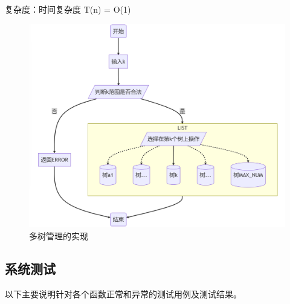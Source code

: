 \documentclass[supercite]{Experimental_Report}
\theoremstyle{definition}
\begin{document}
\begin{enumerate}
复杂度：时间复杂度 T(n) = O(1)
\begin{figure}[H]
	\centering
	\begin{minipage}{0.8\linewidth}
		\centering
		\includegraphics[width=0.9\linewidth]{images/多树管理.png}
	\end{minipage}
	\caption{多树管理的实现}
	\label{fig2-7}
\end{figure}
\newpage

\end{enumerate}
\subsection{系统测试}
以下主要说明针对各个函数正常和异常的测试用例及测试结果。
\end{document}

